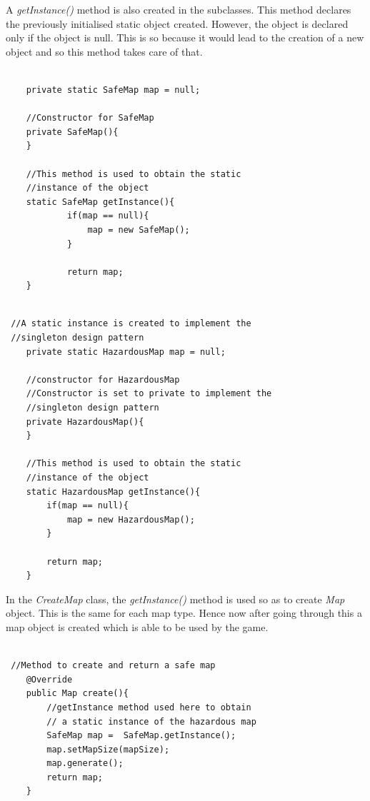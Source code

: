 \documentclass[a4paper,12pt]{extarticle}
\begin{document}
\noindent A \textit{getInstance()} method is also created in the subclasses. This method declares the previously initialised static object created. However, the object is declared only if the object is null. This is so because it would lead to the creation of a new object and so this method takes care of that.\\

\newpage
\begin{lstlisting}

    private static SafeMap map = null;

    //Constructor for SafeMap
    private SafeMap(){
    }

    //This method is used to obtain the static 
    //instance of the object
    static SafeMap getInstance(){
            if(map == null){
                map = new SafeMap();
            }

            return map;
    }
    
\end{lstlisting}
\vspace{4mm}


\begin{lstlisting}
 //A static instance is created to implement the 
 //singleton design pattern
    private static HazardousMap map = null;

    //constructor for HazardousMap
    //Constructor is set to private to implement the 
    //singleton design pattern
    private HazardousMap(){
    }

    //This method is used to obtain the static 
    //instance of the object
    static HazardousMap getInstance(){
        if(map == null){
            map = new HazardousMap();
        }

        return map;
    }

\end{lstlisting}
\vspace{4mm}

\noindent In the \textit{CreateMap} class, the \textit{getInstance()} method is used so as to create \textit{Map} object. This is the same for each map type. Hence now after going through this a map object is created which is able to be used by the game.

\newpage
\begin{lstlisting}

 //Method to create and return a safe map
    @Override
    public Map create(){
        //getInstance method used here to obtain
        // a static instance of the hazardous map
        SafeMap map =  SafeMap.getInstance();
        map.setMapSize(mapSize);
        map.generate();
        return map;
    }


\end{lstlisting}
\vspace{4mm}
\end{document}
